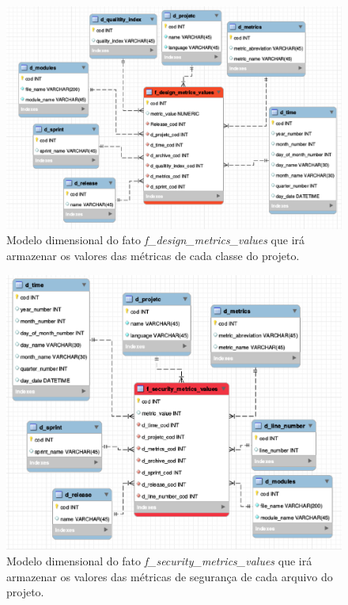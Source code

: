  \begin{figure}[H]
 	\centering
 		\includegraphics[scale=0.5]{figuras/dw-fato-design-metrics}
 		\caption{Modelo dimensional do fato \emph{f\_design\_metrics\_values} que irá armazenar os valores das métricas de cada classe do projeto.}
 		\label{dw-model2}
 \end{figure}

 

 \begin{figure}[H]
 	\centering
 		\includegraphics[scale=0.5]{figuras/dw-fato-security-metrics}
 		\caption{Modelo dimensional do fato \emph{f\_security\_metrics\_values} que irá armazenar os valores das métricas de segurança de cada arquivo do projeto.}
 		\label{dw-model3}
 \end{figure}


